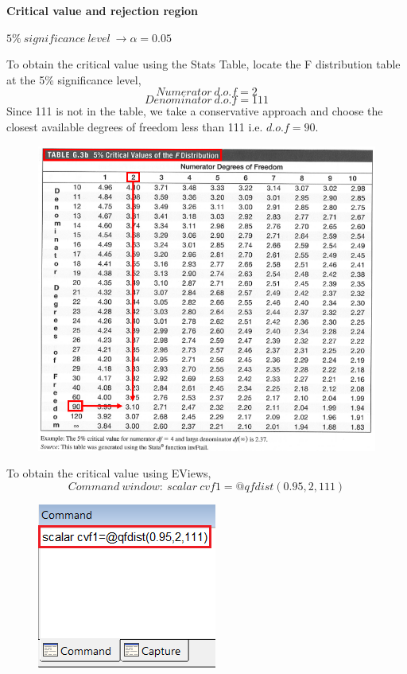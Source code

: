 \documentclass[12pt]{report}
\begin{document}
\noindent \textbf{Critical value and rejection region}

\noindent $5\%\ significance\ level\ \to \alpha = 0.05$

\noindent To obtain the critical value using the Stats Table, locate the F distribution table at the 5\% significance level,
$$Numerator\ d.o.f = 2$$
$$Denominator\ d.o.f = 111$$
\noindent Since 111 is not in the table, we take a conservative approach and choose the closest available degrees of freedom less than 111 i.e. $d.o.f=90$. 
\begin{figure}[H]
	\centerline{\includegraphics{q1_25}}
\end{figure}
\vspace{-\baselineskip}
\noindent To obtain the critical value using EViews,
$$Command\ window:\ scalar\ cvf1=@qfdist(0.95,2,111)$$
\begin{figure}[H]
	\centering
	\includegraphics{q1_26}
\end{figure}
\end{document}
